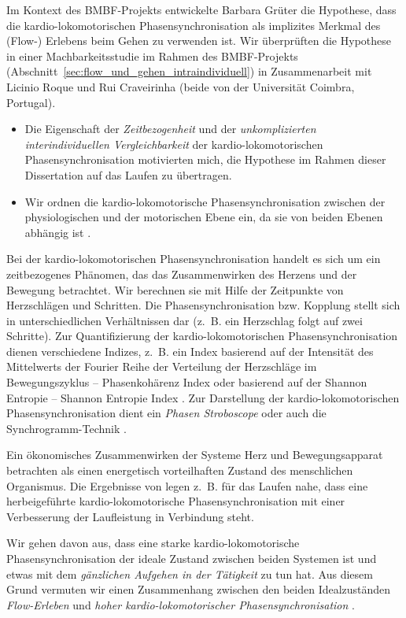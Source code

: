 Im Kontext des \acs{BMBF}-Projekts entwickelte Barbara Grüter die Hypothese, dass die kardio-lokomotorischen Phasensynchronisation als implizites Merkmal des (Flow-) Erlebens beim Gehen zu verwenden ist. Wir überprüften die Hypothese in einer Machbarkeitsstudie im Rahmen des \acs{BMBF}-Projekts (Abschnitt~\ref{sec:flow_und_gehen_intraindividuell}) in Zusammenarbeit mit Licinio Roque und Rui Craveirinha (beide von der Universität Coimbra, Portugal). 
\begin{itemize}
	
	\item Die Eigenschaft der \emph{Zeitbezogenheit} und der \emph{unkomplizierten interindividuellen Vergleichbarkeit} der kardio-lokomotorischen Phasensynchronisation motivierten mich, die Hypothese im Rahmen dieser Dissertation auf das Laufen zu übertragen.
	
	\item Wir ordnen die kardio-lokomotorische Phasensynchronisation zwischen der physiologischen und der motorischen Ebene ein, da sie von beiden Ebenen abhängig ist \citep{Grueter2016a}.
\end{itemize}

Bei der kardio-lokomotorischen Phasensynchronisation handelt es sich um ein zeitbezogenes Phänomen, das das Zusammenwirken des Herzens und der Bewegung betrachtet. Wir berechnen sie mit Hilfe der Zeitpunkte von Herzschlägen und Schritten. Die Phasensynchronisation bzw. Kopplung stellt sich in unterschiedlichen Verhältnissen dar (z.~B. ein Herzschlag folgt auf zwei Schritte). Zur Quantifizierung der kardio-lokomotorischen Phasensynchronisation dienen verschiedene Indizes, z.~B. ein Index basierend auf der Intensität des Mittelwerts der Fourier Reihe der Verteilung der Herzschläge im Bewegungszyklus -- Phasenkohärenz Index \citep{Rosenblum2003} oder basierend auf der Shannon Entropie -- Shannon Entropie Index \citep{Tass1998, Niizeki2005}. Zur Darstellung der kardio-lokomotorischen Phasensynchronisation dient ein \emph{Phasen Stroboscope} \citep{Mrowka2000} oder auch die Synchrogramm-Technik \citep{Schafer1999}.

Ein ökonomisches Zusammenwirken der Systeme Herz und Bewegungsapparat betrachten \citet[S.~18]{Niizeki2014} als einen energetisch vorteilhaften Zustand des menschlichen Organismus. Die Ergebnisse von \citet{Phillips2013} legen z.~B. für das Laufen nahe, dass eine herbeigeführte kardio-lokomotorische Phasensynchronisation mit einer Verbesserung der Laufleistung in Verbindung steht.

Wir gehen davon aus, dass eine starke kardio-lokomotorische Phasensynchronisation der ideale Zustand zwischen beiden Systemen ist und etwas mit dem \emph{gänzlichen Aufgehen in der Tätigkeit} zu tun hat. Aus diesem Grund vermuten wir einen Zusammenhang zwischen den beiden Idealzuständen \emph{Flow-Erleben} und \emph{hoher kardio-lokomotorischer Phasensynchronisation} \citep{Grueter2016a}.

